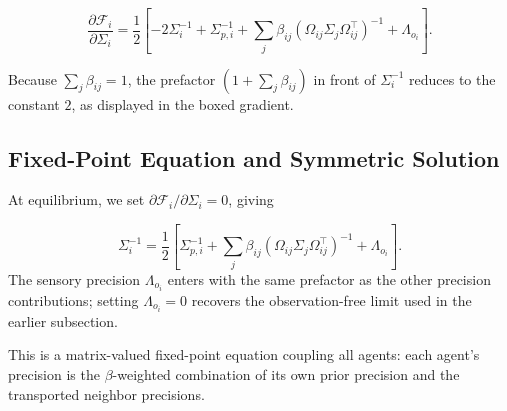 \documentclass[11pt]{article}
\begin{document}
\begin{equation}
\boxed{
\frac{\partial \mathcal{F}_i}{\partial \Sigma_i}
=\frac{1}{2}
\left[
-2 \Sigma_i^{-1}
+ \Sigma_{p,i}^{-1}
+ \sum_j \beta_{ij}
(\Omega_{ij}\Sigma_j\Omega_{ij}^\top)^{-1}
+ \Lambda_{o_i}
\right].
}
\end{equation}

Because $\sum_j \beta_{ij} = 1$, the prefactor $(1 + \sum_j \beta_{ij})$ in front of $\Sigma_i^{-1}$ reduces to the constant $2$, as displayed in the boxed gradient.

\subsection{Fixed-Point Equation and Symmetric Solution}

At equilibrium, we set $\partial \mathcal{F}_i / \partial \Sigma_i = 0$, giving

\begin{equation}
\Sigma_i^{-1}
=\frac{1}{2}
\left[
\Sigma_{p,i}^{-1}
+ \sum_j \beta_{ij}
(\Omega_{ij}\Sigma_j\Omega_{ij}^\top)^{-1}
+ \Lambda_{o_i}
\right].
\label{eq:sigma_fixed_point_beta}
\end{equation}
The sensory precision $\Lambda_{o_i}$ enters with the same prefactor as the other precision contributions; setting $\Lambda_{o_i} = 0$ recovers the observation-free limit used in the earlier subsection.

This is a matrix-valued fixed-point equation coupling all agents: each agent's precision is the $\beta$-weighted combination of its own prior precision and the transported neighbor precisions.
\end{document}
